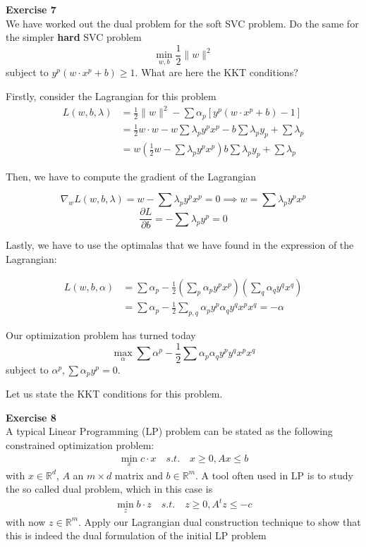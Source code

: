 \documentclass[11pt,table]{article}
\newenvironment{problem}[2][Exercise]
    { \begin{mdframed}[backgroundcolor=gray!20] \textbf{#1 #2} \\}
    {  \end{mdframed}}
\newcommand\norm[1]{\lVert#1\rVert}
\newcommand\R{\mathbb R}
\begin{document}
\begin{problem}{7}
	We have worked out the dual problem for the soft SVC problem. Do the same for the simpler \textbf{hard} SVC problem
	\[
	\min_{w,b} \frac{1}{2} \norm{w}^2  
	\]
	subject to \(y^p\left(w \cdot x^p + b\right) \geq 1\). What are here the KKT conditions?
\end{problem}

Firstly, consider the Lagrangian for this problem
\begin{align*}
L(w,b,\lambda) & = \frac{1}{2} \norm{w}^2 - \sum \alpha_p \left[ y^p \left(w \cdot x^p +b\right) -1 \right]\\
& = \frac{1}{2} w \cdot w - w \sum \lambda_p y^p  x^p - b \sum \lambda_p y_p + \sum \lambda_p \\
& = w \left(\frac{1}{2}w -\sum \lambda_p y^p  x^p \right) b \sum \lambda_p y_p + \sum \lambda_p
\end{align*}

Then, we have to compute the gradient of the Lagrangian

\[
	\nabla_w L(w,b,\lambda) = w - \sum \lambda_p y^p x^p = 0 \implies w = \sum \lambda_p y^p x^p
\]
\[
	\frac{\partial L}{\partial b} = - \sum \lambda_p y^p = 0  
\]

Lastly, we have to use the optimalas that we have found in the expression of the Lagrangian:

\begin{align*}
	L(w,b,\alpha) &= \sum \alpha_p  - \frac{1}{2}\left(\sum_p \alpha_p y^p x^p\right)\left(\sum_q \alpha_q y^q x^q\right) \\
	& = \sum \alpha_p - \frac{1}{2} \sum_{p,q} \alpha_p y^p \alpha_q y^q x^p x^q = - \alpha
\end{align*}

Our optimization problem has turned today
\[
\max_{\alpha} \sum \alpha^p - \frac{1}{2}\sum \alpha_p \alpha_q y^p y^q x^p x^q  
\]
subject to \(\alpha^p, \sum \alpha_p y^p = 0\).

Let us state the KKT conditions for this problem.

\begin{problem}{8}
  A typical Linear Programming (LP) problem can be stated as the following constrained optimization problem:
  \begin{align*}
  \min_x c \cdot x \quad s.t. \quad x \geq 0, Ax \leq b
  \end{align*}
  with \(x \in \R^d\), \(A\) an \(m \times d\) matrix and \(b \in \R^m\). A tool often used in LP is to study the so called dual problem, which in this case is
  \begin{align*}
  \min_{z} b \cdot z \quad s.t. \quad z \geq 0, A^t z \leq -c
  \end{align*}
  with now \(z \in \R^m\). Apply our Lagrangian dual construction technique to show that this is indeed the dual formulation of the initial LP problem
\end{problem}
\end{document}
